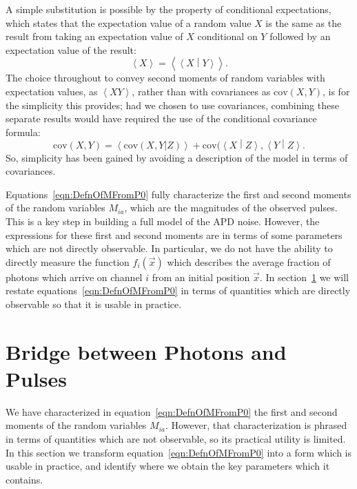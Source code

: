 A simple substitution is possible by the property of conditional expectations, which states that the expectation value of a random value $X$ is the same as the result from taking an expectation value of $X$ conditional on $Y$ followed by an expectation value of the result:~\cite{ProbabilityTextbook}
\begin{equation}
\left<X \right> = \left< \left< X \middle\vert Y\right>\right>.
\end{equation}
The choice throughout to convey second moments of random variables with expectation values, as $\left<XY\right>$, rather than with covariances as $\mathrm{cov}(X,Y)$, is for the simplicity this provides; had we chosen to use covariances, combining these separate results would have required the use of the conditional covariance formula:~\cite{ProbabilityTextbook}
\begin{equation}
\mathrm{cov}(X,Y) = \left<\mathrm{cov}(X,Y \vert Z)\right> + \mathrm{cov}(\left<X\middle\vert Z\right>, \left<Y\middle\vert Z\right>.
\end{equation}
So, simplicity has been gained by avoiding a description of the model in terms of covariances.

Equations~\ref{eqn:DefnOfMFromP0} fully characterize the first and second moments of the random variables $M_{ia}$, which are the magnitudes of the observed pulses.  This is a key step in building a full model of the APD noise.  However, the expressions for these first and second moments are in terms of some parameters which are not directly observable.  In particular, we do not have the ability to directly measure the function $f_i(\vec{x})$ which describes the average fraction of photons which arrive on channel $i$ from an initial position $\vec{x}$.  In section~\ref{sec:BridgePhotonsPulses} we will restate equations~\ref{eqn:DefnOfMFromP0} in terms of quantities which are directly observable so that it is usable in practice.

\section{Bridge between Photons and Pulses}\label{sec:BridgePhotonsPulses}

We have characterized in equation~\ref{eqn:DefnOfMFromP0} the first and second moments of the random variables $M_{ia}$.  However, that characterization is phrased in terms of quantities which are not observable, so its practical utility is limited.  In this section we transform equation~\ref{eqn:DefnOfMFromP0} into a form which is usable in practice, and identify where we obtain the key parameters which it contains.

